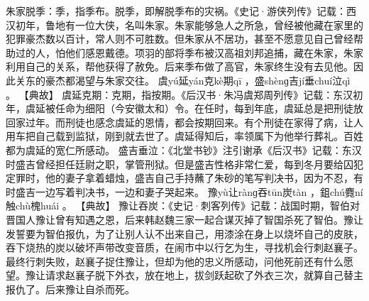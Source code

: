\documentclass[12pt,UTF8]{ctexbook}
\begin{document}
朱家脱季：季，指季布。脱季，即解脱季布的灾祸。《史记·游侠列传》记载：西汉初年，鲁地有一位大侠，名叫朱家。朱家能够急人之所急，曾经被他藏在家里的犯罪豪杰数以百计，常人则不可胜数。但朱家从不居功，甚至不愿意见自己曾经帮助过的人，怕他们感恩戴德。项羽的部将季布被汉高祖刘邦追捕，藏在朱家，朱家利用自己的关系，帮他获得了赦免。后来季布做了高官，朱家终生没有去见他。因此关东的豪杰都渴望与朱家交往。
虞yú延yán克kè期qī
，盛shènɡ吉jí垂chuí泣qì
。
【典故】
虞延克期：克期，指按期。《后汉书·朱冯虞郑周列传》记载：东汉初年，虞延被任命为细阳（今安徽太和）令。在任时，每到年底，虞延总是把刑徒放回家过年。而刑徒也感念虞延的恩情，都会按期回来。有个刑徒在家得了病，让人用车把自己载到监狱，刚到就去世了。虞延得知后，率领属下为他举行葬礼。百姓都为虞延的宽仁所感动。
盛吉垂泣：《北堂书钞》注引谢承《后汉书》记载：东汉时盛吉曾经担任廷尉之职，掌管刑狱。但是盛吉性格非常仁爱，每到冬月要给囚犯定罪时，他的妻子拿着蜡烛，盛吉自己手持蘸了朱砂的笔写判决书，因为不忍，有时盛吉一边写着判决书，一边和妻子哭起来。
豫yù让rànɡ吞tūn炭tàn
，鉏chú麑ní触chù槐huái
。
【典故】
豫让吞炭：《史记·刺客列传》记载：战国时期，智伯对晋国人豫让曾有知遇之恩，后来韩赵魏三家一起合谋灭掉了智国杀死了智伯。豫让发誓要为智伯报仇，为了让别人认不出来自己，用漆涂在身上以烧坏自己的皮肤，吞下烧热的炭以破坏声带改变音质，在闹市中以行乞为生，寻找机会行刺赵襄子。最终行刺失败，赵襄子捉住豫让，但却为他的忠义所感动，问他死前还有什么愿望。豫让请求赵襄子脱下外衣，放在地上，拔剑跃起砍了外衣三次，就算自己替主报仇了。后来豫让自杀而死。
\end{document}

